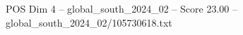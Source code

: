 \begin{textsample}{POS Dim 4 – global\_south\_2024\_02 – Score 23.00 – global\_south\_2024\_02/105730618.txt}
\end{textsample}
